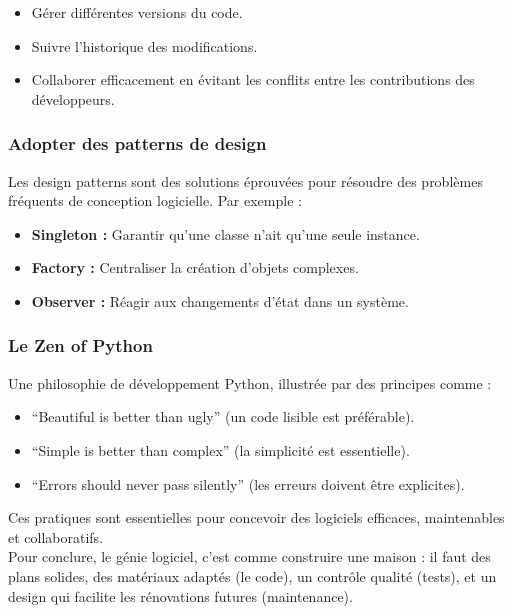 \documentclass[
  letterpaper,
  DIV=11,
  numbers=noendperiod]{scrartcl}
\providecommand{\tightlist}{%
  \setlength{\itemsep}{0pt}\setlength{\parskip}{0pt}}\usepackage{longtable,booktabs,array}
\begin{document}
\begin{itemize}
\tightlist
\item
  Gérer différentes versions du code.
\item
  Suivre l'historique des modifications.
\item
  Collaborer efficacement en évitant les conflits entre les
  contributions des développeurs.
\end{itemize}

\subsubsection{Adopter des patterns de
design}\label{adopter-des-patterns-de-design}

Les design patterns sont des solutions éprouvées pour résoudre des
problèmes fréquents de conception logicielle. Par exemple :

\begin{itemize}
\tightlist
\item
  \textbf{Singleton :} Garantir qu'une classe n'ait qu'une seule
  instance.
\item
  \textbf{Factory :} Centraliser la création d'objets complexes.
\item
  \textbf{Observer :} Réagir aux changements d'état dans un système.
\end{itemize}

\subsubsection{Le Zen of Python}\label{le-zen-of-python}

Une philosophie de développement Python, illustrée par des principes
comme :

\begin{itemize}
\tightlist
\item
  ``Beautiful is better than ugly'' (un code lisible est préférable).
\item
  ``Simple is better than complex'' (la simplicité est essentielle).
\item
  ``Errors should never pass silently'' (les erreurs doivent être
  explicites).
\end{itemize}

Ces pratiques sont essentielles pour concevoir des logiciels efficaces,
maintenables et collaboratifs.\\
Pour conclure, le génie logiciel, c'est comme construire une maison : il
faut des plans solides, des matériaux adaptés (le code), un contrôle
qualité (tests), et un design qui facilite les rénovations futures
(maintenance).
\end{document}
